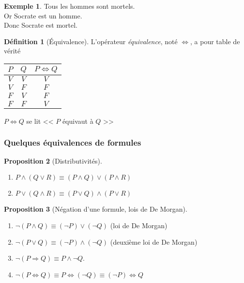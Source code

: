 \documentclass[11pt]{article}
\theoremstyle{definition}
\newtheorem{defn}{Définition}[section]
\newtheorem{prop}[defn]{Proposition}
\newtheorem{exe}{Exemple}
\theoremstyle{remark}
\begin{document}
\begin{exe}
	Tous les hommes sont mortels.\\
	Or Socrate est un homme.\\
	Donc Socrate est mortel.
\end{exe}

\begin{defn}[Équivalence]
L'opérateur \textit{équivalence}, noté $\Leftrightarrow$, a pour table de vérité

\begin{table}[ht]
\centering
\begin{tabular}{|c|c|c|}\hline
$P$ & $Q$ & $P\Leftrightarrow Q$ \\ \hline
$V$ & $V$ & $V$ \\\hline
$V$ & $F$ & $F$ \\\hline
$F$ & $V$ & $F$ \\\hline
$F$ & $F$ & $V$ \\\hline
\end{tabular}
\end{table}

$P\Leftrightarrow Q$ se lit << $P$ équivaut à $Q$ >>
\end{defn}




\subsubsection{Quelques équivalences de formules}

\begin{prop}[Distributivités]\leavevmode
\begin{enumerate}
\item $P\land (Q\lor R) \equiv(P\land Q)\lor (P\land R)$
\item $P\lor(Q\land R)\equiv (P\lor Q)\land (P\lor R)$
\end{enumerate}

\end{prop}

\begin{prop}[Négation d'une formule, lois de De Morgan]\leavevmode
\begin{enumerate}
\item $\neg(P\land Q) \equiv (\neg P)\lor(\neg Q)$ (loi de De Morgan)
\item $\neg(P\lor Q) \equiv (\neg P)\land (\neg Q)$ (deuxième loi de De Morgan)
\item $\neg(P\Rightarrow Q)\equiv P\land\neg Q$.
\item $\neg(P\Longleftrightarrow Q) \equiv P\Longleftrightarrow (\neg Q) \equiv (\neg P) \Longleftrightarrow Q$
\end{enumerate}
\end{prop}
\end{document}
